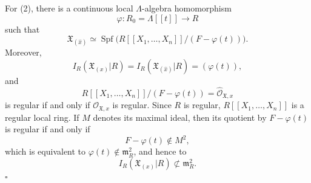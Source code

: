 For (2), there is a continuous local $\Lambda$-algebra homomorphism
\[
\varphi:R_0=\Lambda[[t]]\longrightarrow R
\]
such that
\[
\mathfrak X_{(\widehat x)}
\simeq\operatorname{Spf}
 \bigl(R[[X_1,\ldots,X_n]]/(F-\varphi(t))\bigr).
\]
Moreover,
\[
I_R(\mathfrak X_{(x)}|R)
=I_R(\mathfrak X_{(\widehat x)}|R)
=(\varphi(t)),
\]
and
\[
R[[X_1,\ldots,X_n]]/(F-\varphi(t))
=\widehat{\mathcal O}_{\mathfrak X,x}
\]
is regular if and only if $\mathcal O_{\mathfrak X,x}$ is regular.
Since $R$ is regular,
$R[[X_1,\ldots,X_n]]$ is a regular local ring. If $M$ denotes its
maximal ideal, then its quotient by $F-\varphi(t)$ is regular if and
only if
\[
F-\varphi(t)\notin M^2,
\]
which is equivalent to
$\varphi(t)\notin\mathfrak m_R^2$, and hence to
\[
I_R(\mathfrak X_{(x)}|R)\not\subset\mathfrak m_R^2.
\]
\hfill$\square$
